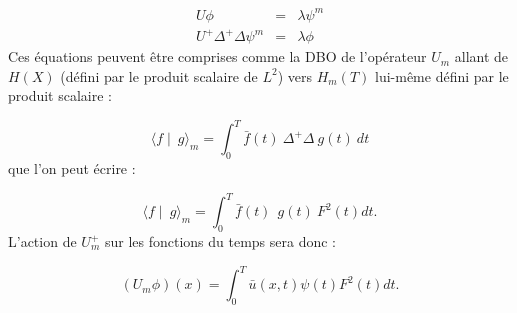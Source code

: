 \documentclass{book}
\begin{document}
\begin{eqnarray}
U\phi&=&\lambda \psi^m\\
U^+\Delta^+\Delta \psi^m&=&\lambda\phi
\end{eqnarray}
Ces \'equations peuvent \^etre comprises comme la DBO
de l'op\'erateur $U_m$ allant de $H(X)$ (d\'efini
par le produit scalaire de $L^2$) vers $H_m(T)$ lui-m\^eme
d\'efini par le produit scalaire :

\begin{equation}
\langle f\mid \ g\rangle _m=\int_{0}^{T}\bar f(t)\ \Delta^+\Delta \
g(t)\ dt 
\end{equation}
que l'on peut \'ecrire :


\begin{equation}
\langle f\mid \ g\rangle _m=\int_{0}^{T}\bar f(t)\ \ g(t)\ F^2(t)dt.
\end{equation}
L'action de $U_m^+$ sur les fonctions du temps sera donc :

\begin{equation}
(U_m\phi)(x)=\int_{0}^{T}\bar{u}(x,t)\psi(t) F^2(t)dt.
\end{equation}












\end{document}
